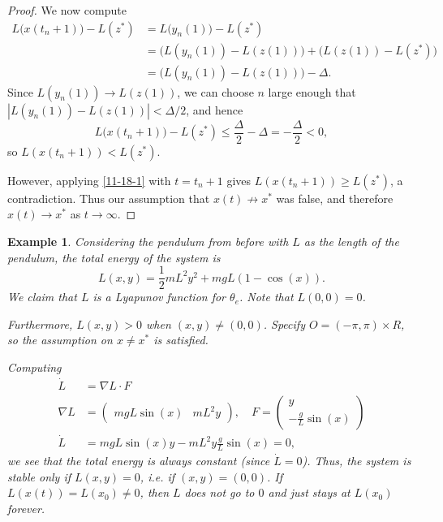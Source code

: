 \documentclass{tufte-handout}
\newtheorem{ex}[thm]{Example}
\theoremstyle{definition}
\begin{document}
\begin{proof}
	We now compute
	\begin{align*}
	  L\bigl(x(t_n + 1)\bigr) - L(z^*)
		&= L\bigl(y_n(1)\bigr) - L(z^*) \\
		&= \bigl(L(y_n(1)) - L(z(1))\bigr)
		   + \bigl(L(z(1)) - L(z^*)\bigr) \\
		&= \bigl(L(y_n(1)) - L(z(1))\bigr) - \Delta.
	\end{align*}
	Since $L(y_n(1)) \to L(z(1))$, we can choose $n$ large enough that
	$|L(y_n(1)) - L(z(1))| < \Delta/2$, and hence
	\[
	  L\bigl(x(t_n + 1)\bigr) - L(z^*)
	  \le \frac{\Delta}{2} - \Delta = -\frac{\Delta}{2} < 0,
	\]
	so $L(x(t_n+1)) < L(z^*)$.

	However, applying \eqref{11-18-1} with $t=t_n+1$ gives
	$L(x(t_n+1)) \ge L(z^*)$, a contradiction. Thus our assumption that
	$x(t)\not\to x^*$ was false, and therefore $x(t)\to x^*$ as $t\to\infty$.
\end{proof}

\begin{ex}
	Considering the pendulum from before with $L$ as the length of the pendulum, the total energy of the system is \[
		L(x,y) = \frac{1}{2}mL^2y^2  + mgL (1-\cos{\left(x\right)})
	.\] We claim that $L$ is a Lyapunov function for $\theta_e$. Note that $L(0,0) = 0$.

	Furthermore, $L(x,y) > 0$ when $(x,y) \ne (0,0)$. Specify $O = (-\pi,\pi) \times R$, so the assumption on $x \ne x^*$ is satisfied.

	Computing
	\begin{align*}
		\dot{L} &= \nabla L \cdot F \\
		\nabla L &= \begin{pmatrix}
			mgL \sin{\left(x\right)} &
			mL^2y
		\end{pmatrix} , \quad F = \begin{pmatrix}
		y \\
		-\frac{g}{L} \sin{\left(x\right)}
		\end{pmatrix}  \\
			\dot{L} &= mgL \sin{\left(x\right)} y - mL^2 y \frac{g}{L} \sin{\left(x\right)} = 0
	,\end{align*}
	we see that the total energy is always constant (since $\dot{L} = 0$).
	Thus, the system is stable only if $L(x,y) = 0$, i.e. if $(x,y) = (0,0)$.
	If $L(x(t)) = L(x_0) \ne 0$, then $L$ does not go to $0$ and just stays at $L(x_0)$ forever.
\end{ex}
\end{document}
